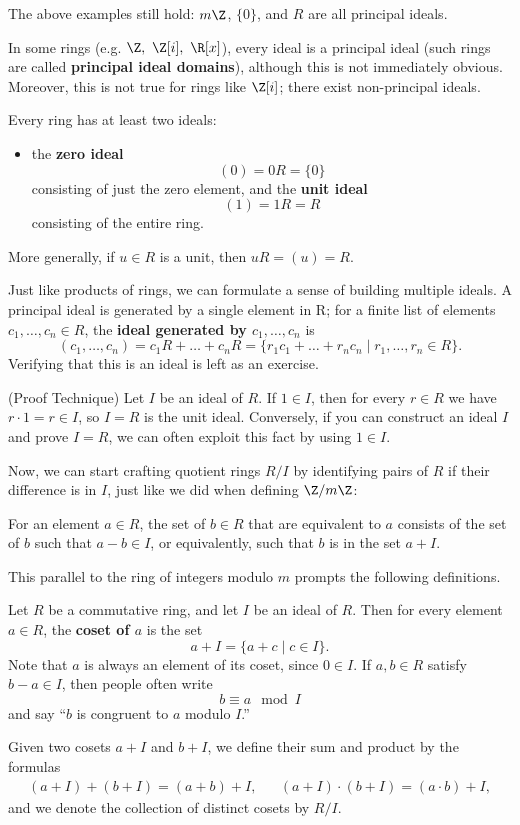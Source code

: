 \documentclass[math1530-lecture-notes]{subfiles}
\begin{document}
The above examples still hold: $m\Z$, $ \{ 0 \}$, and $R$ are all principal ideals.

In some rings (e.g. $\Z,\ \Z[i],\ \R[x]$), every ideal is a principal ideal (such rings are called
\textbf{principal ideal domains}), although this is not immediately obvious. Moreover, this is not
true for rings like $\Z[i]$; there exist non-principal ideals.

\begin{example}
  Every ring has at least two ideals:
  \begin{itemize}
    \item the \textbf{zero ideal} \[
      (0)=0R=\{ 0 \}
    \] consisting of just the zero element, and the \textbf{unit ideal}\[
      (1)=1R=R
    \] consisting of the entire ring.
  \end{itemize}
  More generally, if $u\in R$ is a unit, then $uR = (u) = R$.
\end{example}

Just like products of rings, we can formulate a sense of building multiple ideals. A principal ideal
is generated by a single element in R; for a finite list of elements $c_1,\ldots,c_n\in R$, the
\textbf{ideal generated by $c_1,\ldots,c_n$} is \[
  (c_1,\ldots,c_n)=c_1R+\ldots+c_nR=\{r_1c_1+\ldots+r_nc_n\mid r_1,\ldots,r_n\in R\} 
.\] Verifying that this is an ideal is left as an exercise.

\begin{remark}
  (Proof Technique) Let $I$ be an ideal of $R$. If $1\in I$, then for every $r\in R$ we have $r\cdot
  1=r\in I$, so $I=R$ is the unit ideal. Conversely, if you can construct an ideal $I$ and prove
  $I=R$, we can often exploit this fact by using $1\in I$.
\end{remark}

Now, we can start crafting quotient rings $R/I$ by identifying pairs of $R$ if their difference is
in $I$, just like we did when defining $\Z / m\Z$: \begin{center}
  For an element $a\in R$, the set of $b\in R$ that are equivalent to $a$ consists of the set of $b$ 
  such that $a-b\in I$, or equivalently, such that $b$ is in the set $a+I$.
\end{center}
This parallel to the ring of integers modulo $m$ prompts the following definitions.
\begin{definition}{}
  Let $R$ be a commutative ring, and let $I$ be an ideal of $R$. Then for every element $a\in R$,
  the \textbf{coset of $a$} is the set \[
    a+I=\{a+c\mid c\in I\} 
  .\] Note that $a$ is always an element of its coset, since $0\in I$. If $a,b\in R$ satisfy $b-a\in
  I$, then people often write \[
    b \equiv a\mod{I}
  \] and say ``$b$ is congruent to $a$ modulo $I$.''

  Given two cosets $a+I$ and $b+I$, we define their sum and product by the formulas
  \begin{align*}
    (a+I)+(b+I)=(a+b)+I, && (a+I)\cdot (b+I)=(a\cdot b)+I
  ,\end{align*} and we denote the collection of distinct cosets by $R / I$.
\end{definition}
\end{document}
